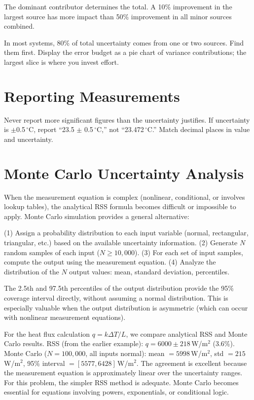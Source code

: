 \documentclass[11pt,letterpaper,twoside,openany]{book}
\newcommand{\degC}{\ensuremath{{}^{\circ}\text{C}}}
\begin{document}
The dominant contributor determines the total. A 10\% improvement in the largest source has more impact than 50\% improvement in all minor sources combined.

\begin{tipbox}
In most systems, 80\% of total uncertainty comes from one or two sources. Find them first. Display the error budget as a pie chart of variance contributions; the largest slice is where you invest effort.
\end{tipbox}

\section{Reporting Measurements}
Never report more significant figures than the uncertainty justifies. If uncertainty is $\pm$0.5\,\degC{}, report ``23.5 $\pm$ 0.5\,\degC{},'' not ``23.472\,\degC{}.'' Match decimal places in value and uncertainty.


\section{Monte Carlo Uncertainty Analysis}
When the measurement equation is complex (nonlinear, conditional, or involves lookup tables), the analytical RSS formula becomes difficult or impossible to apply. Monte Carlo simulation provides a general alternative:

(1) Assign a probability distribution to each input variable (normal, rectangular, triangular, etc.) based on the available uncertainty information. (2) Generate $N$ random samples of each input ($N \geq 10{,}000$). (3) For each set of input samples, compute the output using the measurement equation. (4) Analyze the distribution of the $N$ output values: mean, standard deviation, percentiles.

The 2.5th and 97.5th percentiles of the output distribution provide the 95\% coverage interval directly, without assuming a normal distribution. This is especially valuable when the output distribution is asymmetric (which can occur with nonlinear measurement equations).

\begin{examplebox}
For the heat flux calculation $q = k\Delta T/L$, we compare analytical RSS and Monte Carlo results. RSS (from the earlier example): $q = 6000 \pm 218$\,W/m$^2$ (3.6\%). Monte Carlo ($N = 100{,}000$, all inputs normal): mean $= 5998$\,W/m$^2$, std $= 215$\,W/m$^2$, 95\% interval $= [5577, 6428]$\,W/m$^2$. The agreement is excellent because the measurement equation is approximately linear over the uncertainty ranges. For this problem, the simpler RSS method is adequate. Monte Carlo becomes essential for equations involving powers, exponentials, or conditional logic.
\end{examplebox}
\end{document}
